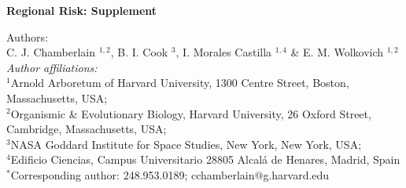 \documentclass{article}\usepackage[]{graphicx}\usepackage[]{color}
\begin{document}
\noindent \textbf{\Large{Regional Risk: Supplement}}

\noindent Authors:\\
C. J. Chamberlain $^{1,2}$, B. I. Cook $^{3}$, I. Morales Castilla $^{1,4}$ \& E. M. Wolkovich $^{1,2}$
\vspace{2ex}\\
\emph{Author affiliations:}\\
$^{1}$Arnold Arboretum of Harvard University, 1300 Centre Street, Boston, Massachusetts, USA; \\
$^{2}$Organismic \& Evolutionary Biology, Harvard University, 26 Oxford Street, Cambridge, Massachusetts, USA; \\
$^{3}$NASA Goddard Institute for Space Studies, New York, New York, USA; \\
$^{4}$Edificio Ciencias, Campus Universitario 28805 Alcalá de Henares, Madrid, Spain \\
\vspace{2ex}
$^*$Corresponding author: 248.953.0189; cchamberlain@g.harvard.edu\\

\renewcommand{\thetable}{\arabic{table}}
\renewcommand{\thefigure}{\arabic{figure}}
\renewcommand{\labelitemi}{$-$}
\end{document}
